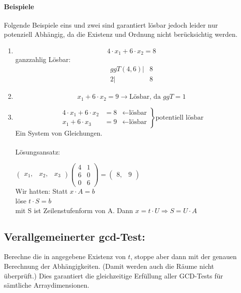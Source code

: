 \paragraph{Beispiele}
Folgende Beispiele eins und zwei sind garantiert lösbar jedoch leider nur potenziell Abhängig, da die Existenz und Ordnung nicht berücksichtig werden.
\begin{enumerate}
  \item {
      \[4 \cdot x_1 + 6 \cdot x_2 = 8 \]
      ganzzahlig Lösbar: \\
      \begin{align*}
         ggT(4,6) |& 8\\
               2  |& 8
      \end{align*}
    }
  \item {\[x_1 + 6 \cdot x_2 = 9 \rightarrow \text{Lösbar, da } ggT = 1 \]}
  \item {
      \[ \left.
          \begin{split}
            4 \cdot x_1 + 6 \cdot x_2 &= 8 &\leftarrow \text{lösbar}\\
            x_1 + 6 \cdot x_3 &= 9 &\leftarrow \text{lösbar}
          \end{split}
       \right\rbrace{\text{potentiell lösbar}} \]
       Ein System von Gleichungen.\\
\\
       Lösungsansatz:

\( \begin{pmatrix}
    x_1 ,& x_2 ,& x_3
   \end{pmatrix}
   \begin{pmatrix}
     4 & 1\\
     6 & 0\\
     0 & 6
   \end{pmatrix}
=
   \begin{pmatrix}
     8 ,& 9
   \end{pmatrix}
\) \\
Wir hatten: Statt \(x \cdot A = b  \) \\
          löse \( t \cdot S = b \) \\
          mit S ist Zeilenstufenform von A.
          Dann \( x = t \cdot U \Rightarrow S = U \cdot A \)
        }
\end{enumerate}


\subsection{Verallgemeinerter gcd-Test:}
Berechne die in   angegebene Existenz von $t$, stoppe aber dann mit der genauen Berechnung der Abhängigkeiten.
(Damit werden auch die Räume nicht überprüft.)
Dies garantiert die gleichzeitige Erfüllung aller GCD-Tests für sämtliche Arraydimensionen.

